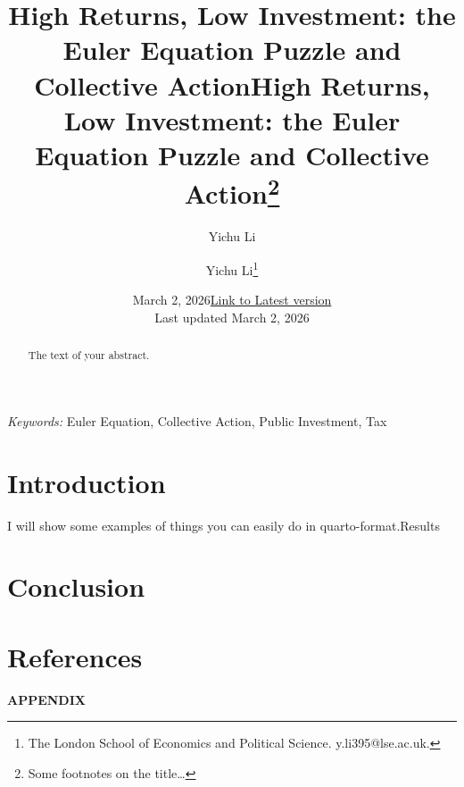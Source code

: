 \documentclass[
  11pt]{article}
\title{High Returns, Low Investment: the Euler Equation Puzzle and
Collective Action}
\author{Yichu Li}
\date{March 2, 2026}
\begin{document}
\def\spacingset#1{\renewcommand{\baselinestretch}%
{#1}\small\normalsize} \spacingset{1}



\date{\href{https://hchulkim.github.io}{Link to Latest version}\\ \vspace{1em}  Last updated March
2, 2026}
\title{High Returns, Low Investment: the Euler Equation Puzzle and
Collective Action\thanks{Some footnotes on the title\ldots{}}}
\author{
Yichu Li\thanks{The London School of Economics and Political Science.
y.li395@lse.ac.uk.}\\
}
\maketitle

\bigskip
\bigskip
\begin{abstract}
The text of your abstract.
\end{abstract}

\bigskip
\noindent%
{\it Keywords:} Euler Equation, Collective Action, Public Investment,
Tax
\vfill

\newpage
\spacingset{1.2} %

\section{Introduction}\label{sec-intro}

I will show some examples of things you can easily do in
quarto-format.Results

\section{Conclusion}\label{sec-conc}

\section*{References}\label{references}

\renewcommand{\bibsection}{}


\label{appendix}
\bigskip

\begin{center}

{\large\bf APPENDIX}

\end{center}
\end{document}
